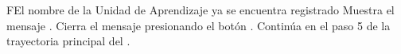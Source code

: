     
    \begin{UCtrayectoriaA}{F}{El nombre de la Unidad de Aprendizaje ya se encuentra registrado}
    	\UCpaso Muestra el mensaje .
    	\UCpaso[\UCactor] Cierra el mensaje presionando el botón .
    	\UCpaso Continúa en el paso 5 de la trayectoria principal del .
    \end{UCtrayectoriaA}